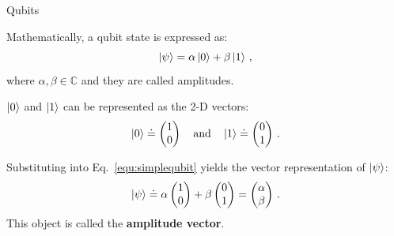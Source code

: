 \documentclass[10pt]{beamer}
\begin{document}
{
\begin{frame}[fragile]{Qubits}

Mathematically, a qubit state is expressed as:
\begin{equation}
\label{equ:simplequbit}
\ket{\psi} = \alpha \ket{0} + \beta \ket{1}\, ,
\end{equation}
where $\alpha, \beta \in \mathbb{C}$ and they are called amplitudes.

$\ket{0}$ and $\ket{1}$ can be represented as the 2-D vectors:
\begin{equation}
\ket{0} \doteq  \begin{pmatrix}1\\0\end{pmatrix} \quad \mathrm{and} \quad \ket{1} \doteq \begin{pmatrix}0\\1\end{pmatrix}\, .
\end{equation}

Substituting into Eq.~\ref{equ:simplequbit} yields the vector representation of $\ket{\psi}$:
\begin{equation}
\ket{\psi} \doteq \alpha \begin{pmatrix} 1\\0 \end{pmatrix} + \beta \begin{pmatrix}0\\1 \end{pmatrix} = \begin{pmatrix}\alpha\\\beta\end{pmatrix}\, .
\end{equation}
This object is called the \textbf{amplitude vector}.
\end{frame}
}
\end{document}
